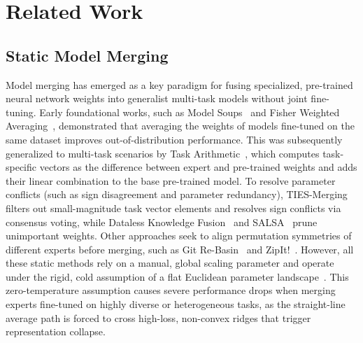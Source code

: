 \section{Related Work}
\label{sec:related_work}

\subsection{Static Model Merging}
Model merging has emerged as a key paradigm for fusing specialized, pre-trained neural network weights into generalist multi-task models without joint fine-tuning. Early foundational works, such as Model Soups~\cite{wortsman2022model} and Fisher Weighted Averaging~\cite{matena2021merging}, demonstrated that averaging the weights of models fine-tuned on the same dataset improves out-of-distribution performance. This was subsequently generalized to multi-task scenarios by Task Arithmetic~\cite{ilharco2022editing}, which computes task-specific vectors as the difference between expert and pre-trained weights and adds their linear combination to the base pre-trained model. To resolve parameter conflicts (such as sign disagreement and parameter redundancy), TIES-Merging~\cite{yadav2023ties} filters out small-magnitude task vector elements and resolves sign conflicts via consensus voting, while Dataless Knowledge Fusion~\cite{jin2022dataless} and SALSA~\cite{yu2023language} prune unimportant weights. Other approaches seek to align permutation symmetries of different experts before merging, such as Git Re-Basin~\cite{ainsworth2022git} and ZipIt!~\cite{stoica2023zip}. However, all these static methods rely on a manual, global scaling parameter and operate under the rigid, cold assumption of a flat Euclidean parameter landscape~\cite{ortizjimenez2023task}. This zero-temperature assumption causes severe performance drops when merging experts fine-tuned on highly diverse or heterogeneous tasks, as the straight-line average path is forced to cross high-loss, non-convex ridges that trigger representation collapse.

